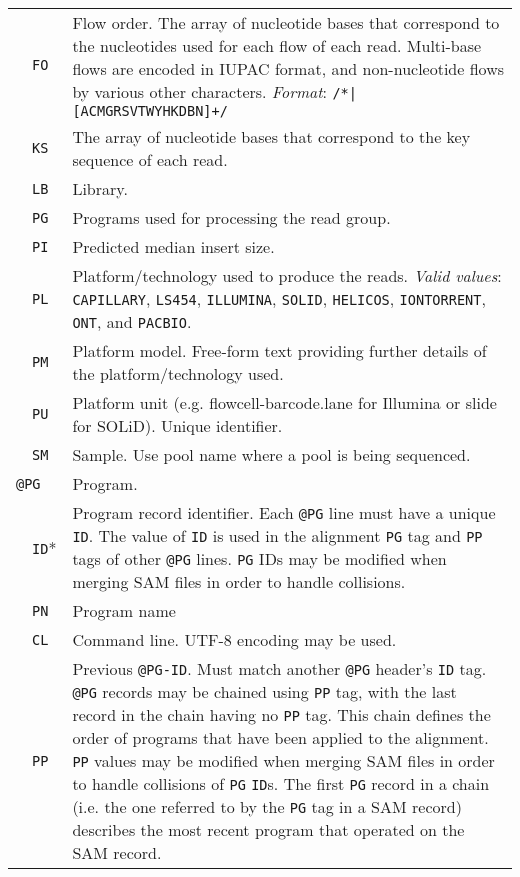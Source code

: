 \documentclass[10pt]{article}
\begin{document}
\begin{center}
\begin{longtable}{|l|l|p{13.5cm}|}
  & {\tt FO} & Flow order. The array of nucleotide bases that correspond to the nucleotides used for each flow of each read.
  	Multi-base flows are encoded in IUPAC format, and non-nucleotide flows by various other characters. \emph{Format}: {\tt /\char92*|[ACMGRSVTWYHKDBN]+/}\\\cline{2-3}
  & {\tt KS} & The array of nucleotide bases that correspond to the key sequence of each read.\\\cline{2-3}
  & {\tt LB} & Library.\\\cline{2-3}
  & {\tt PG} & Programs used for processing the read group.\\\cline{2-3}
  & {\tt PI} & Predicted median insert size.\\\cline{2-3}
  & {\tt PL} & Platform/technology used to produce the reads. \emph{Valid values}:
  {\tt CAPILLARY}, {\tt LS454}, {\tt ILLUMINA}, {\tt SOLID}, {\tt HELICOS}, {\tt IONTORRENT}, {\tt ONT}, and {\tt PACBIO}.\\\cline{2-3}
  & {\tt PM} & Platform model. Free-form text providing further details of the
  platform/technology used.\\\cline{2-3}
  & {\tt PU} & Platform unit (e.g. flowcell-barcode.lane for Illumina or slide for SOLiD). Unique identifier.\\\cline{2-3}
  & {\tt SM} & Sample. Use pool name where a pool is being sequenced.\\\cline{1-3}
  \multicolumn{2}{|l}{\tt @PG} & Program. \\\cline{2-3}
  & {\tt ID}* & Program record identifier. Each {\tt @PG} line must have a unique {\tt ID}.
  	The value of {\tt ID} is used in the alignment {\tt PG} tag and {\tt PP} tags of other {\tt @PG} lines.
	{\tt PG} IDs may be modified when merging SAM files in order to handle collisions.\\\cline{2-3}
  & {\tt PN} & Program name \\\cline{2-3}
  & {\tt CL} & Command line.  UTF-8 encoding may be used. \\\cline{2-3}
  & {\tt PP} & Previous {\tt @PG-ID}. Must match another {\tt @PG} header's {\tt ID} tag.
  	{\tt @PG} records may be chained using {\tt PP} tag, with the last record in the chain
	having no {\tt PP} tag. This chain defines the order of programs that have been applied to the alignment.
	{\tt PP} values may be modified when merging SAM files in order to handle collisions of {\tt PG} {\tt ID}s.
	The first {\tt PG} record in a chain (i.e. the one referred to by the {\tt PG} tag in a SAM record)
	describes the most recent program that operated on the SAM record.

\end{longtable}
\end{center}
\end{document}
